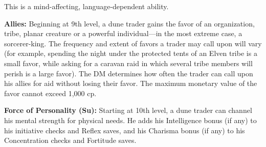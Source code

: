 {This is a mind-affecting, language-dependent ability.

\textbf{Allies:} Beginning at 9th level, a dune trader gains the favor of an organization, tribe, planar creature or a powerful individual---in the most extreme case, a sorcerer-king. The frequency and extent of favors a trader may call upon will vary (for example, spending the night under the protected tents of an Elven tribe is a small favor, while asking for a caravan raid in which several tribe members will perish is a large favor). The DM determines how often the trader can call upon his allies for aid without losing their favor. The maximum monetary value of the favor cannot exceed 1,000 cp.

\textbf{Force of Personality (Su):} Starting at 10th level, a dune trader can channel his mental strength for physical needs. He adds his Intelligence bonus (if any) to his initiative checks and Reflex saves, and his Charisma bonus (if any) to his Concentration checks and Fortitude saves.
}